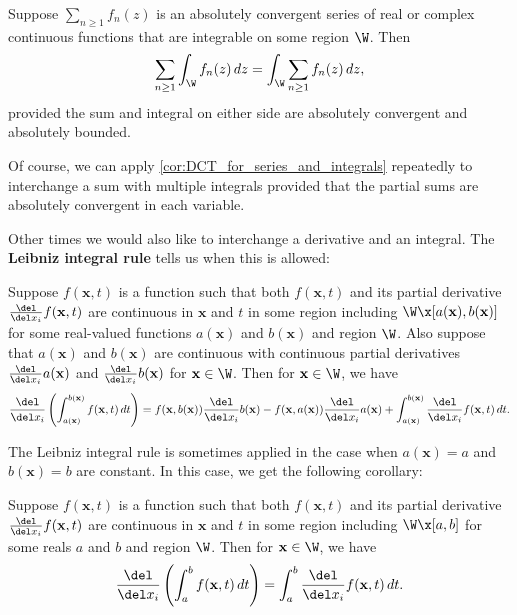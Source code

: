     \begin{corollary}\label{cor:DCT_for_series_and_integrals}
      Suppose $\sum_{n \ge 1}f_{n}(z)$ is an absolutely convergent series of real or complex continuous functions that are integrable on some region $\W$. Then
      \[
        \sum_{n \ge 1}\int_{\W}f_{n}(z)\,dz = \int_{\W}\sum_{n \ge 1}f_{n}(z)\,dz,
      \]
      provided the sum and integral on either side are absolutely convergent and absolutely bounded.
    \end{corollary}

    Of course, we can apply \cref{cor:DCT_for_series_and_integrals} repeatedly to interchange a sum with multiple integrals provided that the partial sums are absolutely convergent in each variable.

    Other times we would also like to interchange a derivative and an integral. The \textbf{Leibniz integral rule} tells us when this is allowed:

    \begin{theorem}
      Suppose $f(\mathbf{x},t)$ is a function such that both $f(\mathbf{x},t)$ and its partial derivative $\frac{\del}{\del x_{i}}f(\mathbf{x},t)$ are continuous in $\mathbf{x}$ and $t$ in some region including $\W \x [a(\mathbf{x}),b(\mathbf{x})]$ for some real-valued functions $a(\mathbf{x})$ and $b(\mathbf{x})$ and region $\W$. Also suppose that $a(\mathbf{x})$ and $b(\mathbf{x})$ are continuous with continuous partial derivatives $\frac{\del}{\del x_{i}}a(\mathbf{x})$ and $\frac{\del}{\del x_{i}}b(\mathbf{x})$ for $\mathbf{x} \in \W$. Then for $\mathbf{x} \in \W$, we have
      \[
        \frac{\del}{\del x_{i}}\left(\int_{a(\mathbf{x})}^{b(\mathbf{x})}f(\mathbf{x},t)\,dt\right) = f(\mathbf{x},b(\mathbf{x}))\frac{\del}{\del x_{i}}b(\mathbf{x})-f(\mathbf{x},a(\mathbf{x}))\frac{\del}{\del x_{i}}a(\mathbf{x})+\int_{a(\mathbf{x})}^{b(\mathbf{x})}\frac{\del}{\del x_{i}}f(\mathbf{x},t)\,dt.
      \]
    \end{theorem}
    
    The Leibniz integral rule is sometimes applied in the case when $a(\mathbf{x}) = a$ and $b(\mathbf{x}) = b$ are constant. In this case, we get the following corollary:

    \begin{corollary}
      Suppose $f(\mathbf{x},t)$ is a function such that both $f(\mathbf{x},t)$ and its partial derivative $\frac{\del}{\del x_{i}}f(\mathbf{x},t)$ are continuous in $\mathbf{x}$ and $t$ in some region including $\W \x [a,b]$ for some reals $a$ and $b$ and region $\W$. Then for $\mathbf{x} \in \W$, we have
      \[
        \frac{\del}{\del x_{i}}\left(\int_{a}^{b}f(\mathbf{x},t)\,dt\right) = \int_{a}^{b}\frac{\del}{\del x_{i}}f(\mathbf{x},t)\,dt.
      \]
    \end{corollary}
